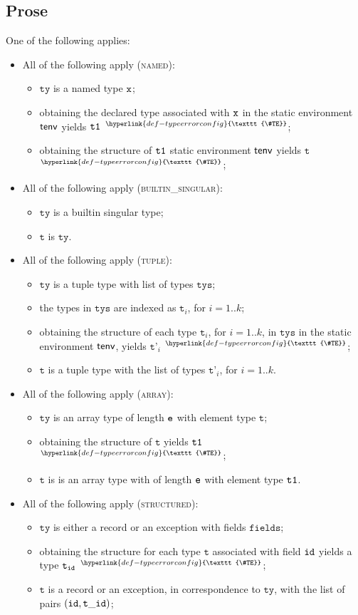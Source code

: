 \documentclass{book}
\newcommand\TypeErrorConfig[0]{\hyperlink{def-typeerrorconfig}{\texttt{\#TE}}}
\newcommand\ProseOrTypeError[0]{\hyperlink{def-proseortypeerror}{$^{\TypeErrorConfig}$}}
\newcommand\vt[0]{\texttt{t}}
\newcommand\tty[0]{\texttt{ty}}
\newcommand\fields[0]{\texttt{fields}}
\newcommand\vtp[0]{\texttt{t'}}
\newcommand\tys[0]{\texttt{tys}}
\begin{document}
\subsection{Prose}
One of the following applies:
\begin{itemize}
\item All of the following apply (\textsc{named}):
  \begin{itemize}
  \item $\tty$ is a named type $\texttt{x}$;
  \item obtaining the declared type associated with $\texttt{x}$ in the static environment $\textsf{tenv}$ yields $\texttt{t1}$ \ProseOrTypeError;
  \item obtaining the structure of $\texttt{t1}$ static environment $\textsf{tenv}$ yields $\vt$ \ProseOrTypeError;
  \end{itemize}
\item All of the following apply (\textsc{builtin\_singular}):
  \begin{itemize}
  \item $\tty$ is a builtin singular type;
  \item $\vt$ is $\tty$.
  \end{itemize}
\item All of the following apply (\textsc{tuple}):
  \begin{itemize}
  \item $\tty$ is a tuple type with list of types $\tys$;
  \item the types in $\tys$ are indexed as $\vt_i$, for $i=1..k$;
  \item obtaining the structure of each type $\vt_i$, for $i=1..k$, in $\tys$ in the static environment $\textsf{tenv}$,
  yields $\vtp_i$ \ProseOrTypeError;
  \item $\vt$ is a tuple type with the list of types $\vtp_i$, for $i=1..k$.
  \end{itemize}
\item All of the following apply (\textsc{array}):
  \begin{itemize}
    \item $\tty$ is an array type of length $\texttt{e}$ with element type $\vt$;
    \item obtaining the structure of $\vt$ yields $\texttt{t1}$ \ProseOrTypeError;
    \item $\vt$ is is an array type with of length $\texttt{e}$ with element type $\texttt{t1}$.
  \end{itemize}
\item All of the following apply (\textsc{structured}):
  \begin{itemize}
  \item $\tty$ is either a record or an exception with fields $\fields$;
  \item obtaining the structure for each type $\vt$ associated with field $\texttt{id}$ yields a type $\vt_\id$ \ProseOrTypeError;
  \item $\vt$ is a record or an exception, in correspondence to $\tty$, with the list of pairs $(\id, \vt\_\id)$;
  \end{itemize}
\end{itemize}
\end{document}
